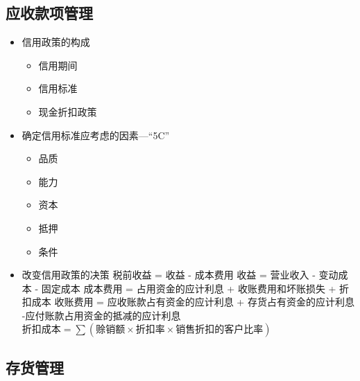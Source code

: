 \documentclass[11pt]{article}
\begin{document}
\subsection{应收款项管理}
\label{sec:org9ce8e32}
\begin{itemize}
\item 信用政策的构成
\begin{itemize}
\item 信用期间
\item 信用标准
\item 现金折扣政策
\end{itemize}
\item 确定信用标准应考虑的因素---``5C''
\begin{itemize}
\item 品质
\item 能力
\item 资本
\item 抵押
\item 条件
\end{itemize}
\item 改变信用政策的决策
税前收益 = 收益 - 成本费用
收益 = 营业收入 - 变动成本 - 固定成本
成本费用 = 占用资金的应计利息 + 收账费用和坏账损失 + 折扣成本
收账费用 = 应收账款占有资金的应计利息 + 存货占有资金的应计利息 -应付账款占用资金的抵减的应计利息
\(折扣成本 = \sum(赊销额\times 折扣率 \times 销售折扣的客户比率)\)
\end{itemize}
\subsection{存货管理}
\label{sec:org2bc5e4f}
\end{document}
